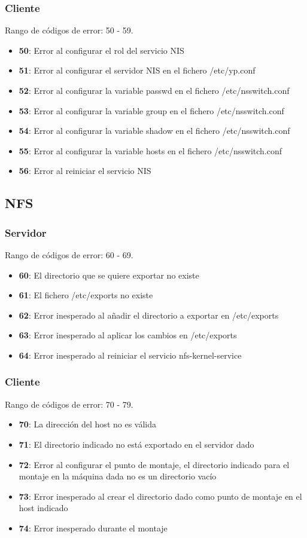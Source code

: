\documentclass[12pt,a4paper, spanish]{article}
\begin{document}
\subsubsection{Cliente}
Rango de códigos de error: 50 - 59.
\begin{itemize}
\item \textbf{50}: Error al configurar el rol del servicio NIS
\item \textbf{51}: Error al configurar el servidor NIS en el fichero /etc/yp.conf
\item \textbf{52}: Error al configurar la variable passwd en el fichero /etc/nsswitch.conf
\item \textbf{53}: Error al configurar la variable group en el fichero /etc/nsswitch.conf
\item \textbf{54}: Error al configurar la variable shadow en el fichero /etc/nsswitch.conf
\item \textbf{55}: Error al configurar la variable hosts en el fichero /etc/nsswitch.conf
\item \textbf{56}: Error al reiniciar el servicio NIS
\end{itemize}

\subsection{NFS}

\subsubsection{Servidor}
Rango de códigos de error: 60 - 69.
\begin{itemize}
\item \textbf{60}: El directorio que se quiere exportar no existe
\item \textbf{61}: El fichero /etc/exports no existe
\item \textbf{62}: Error inesperado al añadir el directorio a exportar en /etc/exports
\item \textbf{63}: Error inesperado al aplicar los cambios en /etc/exports
\item \textbf{64}: Error inesperado al reiniciar el servicio nfs-kernel-service
\end{itemize}

\subsubsection{Cliente}
Rango de códigos de error: 70 - 79.
\begin{itemize}
\item \textbf{70}: La dirección del host no es válida
\item \textbf{71}: El directorio indicado no está exportado en el servidor dado
\item \textbf{72}: Error al configurar el punto de montaje, el directorio indicado para el montaje en la máquina dada no es un directorio vacío
\item \textbf{73}: Error inesperado al crear el directorio dado como punto de montaje en el host indicado
\item \textbf{74}: Error inesperado durante el montaje
\end{itemize}
\end{document}
